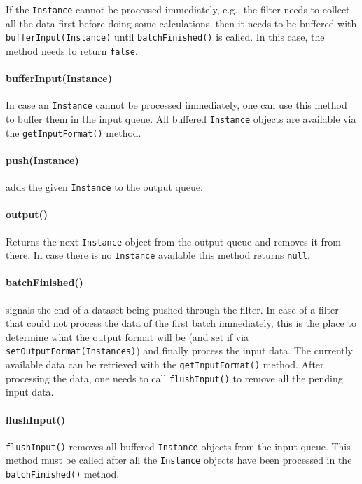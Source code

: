 If the \texttt{Instance} cannot be processed immediately, e.g., the filter needs
to collect all the data first before doing some calculations, then it needs to
be buffered with \texttt{bufferInput(Instance)} until \texttt{batchFinished()}
is called. In this case, the method needs to return \texttt{false}.

\paragraph{bufferInput(Instance)}
In case an \texttt{Instance} cannot be processed immediately, one can use this
method to buffer them in the input queue. All buffered \texttt{Instance} objects
are available via the \texttt{getInputFormat()} method.

\paragraph{push(Instance)}
adds the given \texttt{Instance} to the output queue.

\paragraph{output()}
Returns the next \texttt{Instance} object from the output queue and removes it
from there. In case there is no \texttt{Instance} available this method returns
\texttt{null}.

\newpage
\paragraph{batchFinished()} signals the end of a dataset being pushed
through the filter. In case of a filter that could not process the data of the
first batch immediately, this is the place to determine what the output format
will be (and set if via \texttt{setOutputFormat(Instances)}) and finally process
the input data. The currently available data can be retrieved with the
\texttt{getInputFormat()} method. After processing the data, one needs to call
\texttt{flushInput()} to remove all the pending input data.

\paragraph{flushInput()}
\texttt{flushInput()} removes all buffered \texttt{Instance} objects from the
input queue. This method must be called after all the \texttt{Instance} objects
have been processed in the \texttt{batchFinished()} method.

